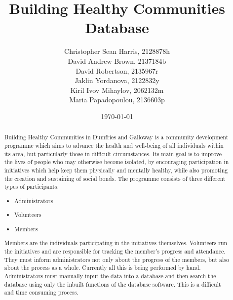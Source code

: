 \documentclass{l3proj}
\begin{document}
\title{Building Healthy Communities Database}

\author{
Christopher Sean Harris, 2128878h \\
David Andrew Brown, 2137184b \\
David Robertson, 2135967r \\
Jaklin Yordanova, 2122832y \\
Kiril Ivov Mihaylov, 2062132m \\
Maria Papadopoulou, 2136603p}

\date{\today}

\maketitle

\begin{abstract}

Building Healthy Communities in Dumfries and Galloway is a community development programme which aims to advance the health and well-being of all individuals within its area, but particularly those in difficult circumstances. Its main goal is to improve the lives of people who may otherwise become isolated, by encouraging participation in initiatives which help keep them physically and mentally healthy, while also promoting the creation and sustaining of social bonds. The programme consists of three different types of participants:
\begin{itemize}
	\item Administrators
	\item Volunteers
	\item Members
\end{itemize}
Members are the individuals participating in the initiatives themselves. Volunteers run the initiatives and are responsible for tracking the member's progress and attendance. They must inform administrators not only about the progress of the members, but also about the process as a whole. Currently all this is being performed by hand. Administrators must manually input the data into a database and then search the database using only the inbuilt functions of the database software. This is a difficult and time consuming process.


\end{abstract}
\end{document}
